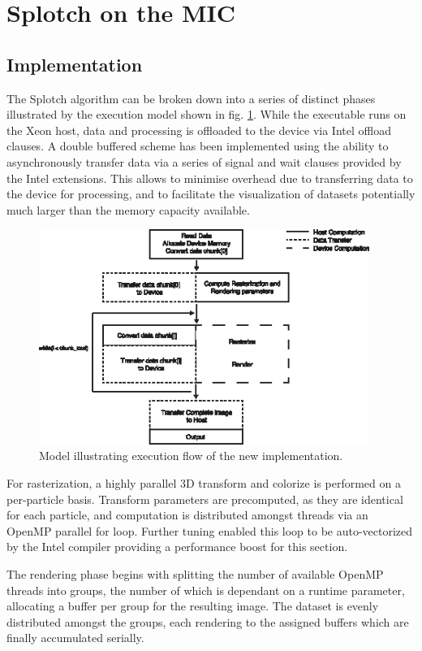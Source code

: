 \documentclass[runningheads,a4paper]{llncs}
\begin{document}
\section{Splotch on the MIC}
\label{sect:micsplotch}


\subsection{Implementation}
\label{sect:micimplementation}


The Splotch algorithm can be broken down into a series of distinct phases illustrated by the execution model shown in fig. \ref{fig:exmodel}.
While the executable runs on the Xeon host, data and processing is offloaded to the device via Intel offload clauses.
A double buffered scheme has been implemented using the ability to asynchronously transfer data via a series of signal 
and wait clauses provided by the Intel extensions. This allows to minimise overhead due to transferring data to the device 
for processing, and to facilitate the visualization of datasets potentially much larger than the memory capacity available.

\begin{figure}
\centering
\includegraphics[height=7.0cm]{ExecutionModel}
\caption{Model illustrating execution flow of the new implementation.}
\label{fig:exmodel}
\end{figure}

For rasterization, a highly parallel 3D transform and colorize is performed on a per-particle
basis. Transform parameters are precomputed, as they are identical for each particle, and computation is distributed amongst
threads via an OpenMP parallel for loop. Further tuning enabled this loop to be auto-vectorized by the Intel compiler providing a 
performance boost for this section.

The rendering phase begins with splitting the number of available OpenMP threads into groups, the number of which is dependant on 
a runtime parameter, allocating a buffer per group for the resulting image. The dataset is evenly distributed amongst the 
groups, each rendering to the assigned buffers which are finally accumulated serially. 
\end{document}
